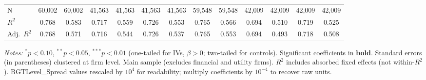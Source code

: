 \documentclass[11pt,a4paper]{article}
\begin{document}
\begin{table}[htbp]
\begin{tabular}{lcccccccccccc}
\midrule
N & 60,002 & 60,002 & 41,563 & 41,563 & 41,563 & 41,563 & 59,548 & 59,548 & 42,009 & 42,009 & 42,009 & 42,009 \\
$R^2$ & 0.768 & 0.583 & 0.717 & 0.559 & 0.726 & 0.553 & 0.765 & 0.566 & 0.694 & 0.510 & 0.719 & 0.525 \\
Adj.~$R^2$ & 0.768 & 0.571 & 0.716 & 0.544 & 0.726 & 0.537 & 0.765 & 0.553 & 0.694 & 0.493 & 0.718 & 0.508 \\
\bottomrule
\end{tabular}
\begin{minipage}{\linewidth}
\vspace{2pt}\scriptsize
\textit{Notes:} $^{*}p<0.10$, $^{**}p<0.05$, $^{***}p<0.01$ (one-tailed for IVs, $\beta > 0$; two-tailed for controls).
 Significant coefficients in \textbf{bold}.
 Standard errors (in parentheses) clustered at firm level.
 Main sample (excludes financial and utility firms).
 $R^2$ includes absorbed fixed effects (not within-$R^2$).
 BGTLevel\_Spread values rescaled by $10^4$ for readability; multiply coefficients by $10^{-4}$ to recover raw units.
\end{minipage}
\end{table}
\clearpage
\end{document}
